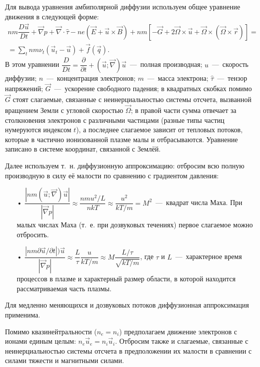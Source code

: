 \documentclass[14pt, a4paper]{extarticle}
\begin{document}
Для вывода уравнения амбиполярной диффузии используем общее уравнение движения в следующей форме: 
\begin{gather} 
nm\dfrac{D\vec{u}}{Dt}+\vec{\nabla} p + \vec{\nabla}\cdot \hat{\tau} - ne(\vec{E}+\vec{u}\times \vec{B})+nm[-\vec{G}+2\vec{\Omega}\times \vec{u}+\vec{\Omega}\times(\vec{\Omega}\times\vec{r})]=\nonumber\\
=\sum_t nm\nu_t (\vec{u}_t-\vec{u})+ \vec{f}(\vec{q}).
\end{gather}
В этом уравнении $\dfrac{D}{Dt}=\dfrac{\partial}{\partial t}+(\vec{u}; \vec{\nabla})\vec{u}$~---~полная производная; $u$~---~скорость диффузии; $n$~---~концентрация электронов; $m$~---~масса электрона; $\hat{\tau}$~---~тензор напряжений; $\vec{G}$~---~ускорение свободного падения; в квадратных скобках помимо $\vec{G}$ стоят слагаемые, связанные с неинерциальностью системы отсчета, вызванной вращением Земли с угловой скоростью $\vec{\Omega}$; в правой части сумма отвечает за столкновения электронов с различными частицами (разные типы частиц нумеруются индексом $t$), а последнее слагаемое зависит от тепловых потоков, которые в частично ионизованной плазме малы и отбрасываются. Уравнение записано в системе координат, связанной с Землёй.

\bigskip

Далее используем т.~н. диффузионную аппроксимацию: отбросим всю полную производную в силу её малости по сравнению с градиентом давления:

\begin{itemize}

\item[•] $\dfrac{|nm(\vec{u}; \vec{\nabla})\vec{u}|}{|\vec{\nabla}p|}\approx \dfrac{nmu^2/L}{nkT}\approx \dfrac{u^2}{kT/m}=M^2$~---~квадрат числа Маха. При малых числах Маха (т.~е. при дозвуковых течениях) первое слагаемое можно отбросить.

\item[•] $\dfrac{|nm\partial\vec{u}/\partial t|)\vec{u}}{|\vec{\nabla}p|}\approx \dfrac{L}{\tau} \dfrac{u}{kT/m}\approx M\dfrac{L/\tau}{\sqrt{kT/m}}$, где $\tau$ и $L$~---~характерное время процессов в плазме и характерный размер области, в которой находится рассматриваемая часть плазмы.

\end{itemize}

Для медленно меняющихся и дозвуковых потоков диффузионная аппроксимация применима.

\bigskip

Помимо квазинейтральности ($n_e=n_i$) предполагаем движение электронов с ионами единым целым: $n_e \vec{u}_e=n_i \vec{u}_i$. Отбросим также и слагаемые, связанные с неинерциальностью системы отсчета в предположении их малости в сравнении с силами тяжести и магнитными силами.
\end{document}

